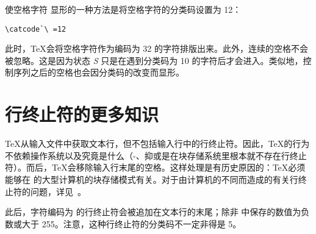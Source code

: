 \documentclass{book}
\begin{document}
使空格字符 \textvisiblespace 显形的一种方法是将空格字符的分类码设置为 12：
\begin{verbatim}
\catcode`\ =12
\end{verbatim}
此时，\TeX 会将空格字符作为编码为 32 的字符排版出来。此外，连续的空格不会被忽略。这是因为状态 {\itshape S} 只是在遇到分类码为 10 的字符后才会进入。类似地，控制序列之后的空格也会因分类码的改变而显形。

\section{行终止符的更多知识}

\TeX 从输入文件中获取文本行，但不包括输入行中的行终止符。因此，\TeX 的行为不依赖操作系统以及究竟是什么（-、抑或是在块存储系统里根本就不存在行终止符）。而后，\TeX 会移除输入行末尾的空格。这样处理是有历史原因的：\TeX 必须能够在  的大型计算机的块存储模式有关。对于由计算机的不同而造成的有关行终止符的问题，详见~\cite{B:ctrl-M}。

此后，字符编码为  的行终止符会被追加在文本行的末尾；除非  中保存的数值为负数或大于 255。注意，这种行终止符的分类码不一定非得是 5。
\end{document}
